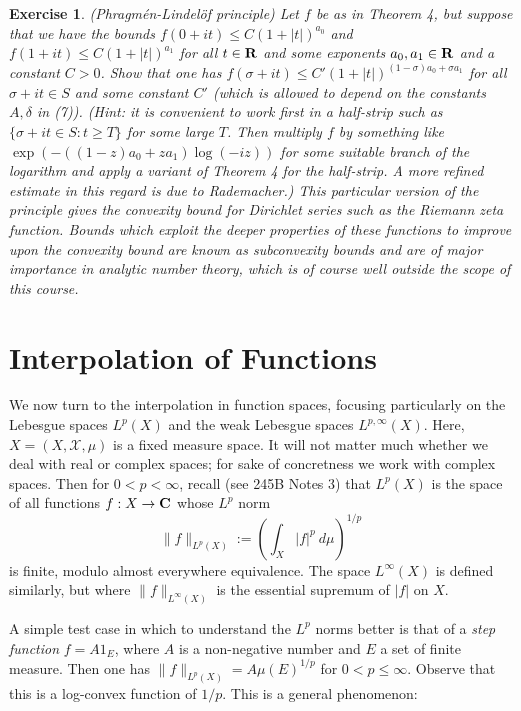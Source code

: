 \documentclass[10pt,reqno]{amsart}
\newtheorem{exercise}[theorem]{Exercise}
\begin{document}
\begin{exercise}
    (Phragmén-Lindelöf principle) Let $f$ be as in Theorem 4, but suppose that we have the bounds $f(0+it) \leq C(1+|t|)^{a_0}$ and $f(1+it) \leq C(1+|t|)^{a_1}$ for all $t \in {\bf R}$ and some exponents $a_0,a_1 \in {\bf R}$ and a constant $C>0$. Show that one has $f(\sigma+it) \leq C' (1+|t|)^{(1-\sigma) a_0 + \sigma a_1}$ for all $\sigma+it \in S$ and some constant $C'$ (which is allowed to depend on the constants $A, \delta$ in (7)). (Hint: it is convenient to work first in a half-strip such as $\{ \sigma+it \in S: t \geq T \}$ for some large $T$. Then multiply $f$ by something like $\exp( - ((1-z)a_0+z a_1) \log(-iz) )$ for some suitable branch of the logarithm and apply a variant of Theorem 4 for the half-strip. A more refined estimate in this regard is \emph{due to Rademacher}.) This particular version of the principle gives the \emph{convexity bound} for Dirichlet series such as the Riemann zeta function. Bounds which exploit the deeper properties of these functions to improve upon the convexity bound are known as \emph{subconvexity bounds} and are of major importance in analytic number theory, which is of course well outside the scope of this course. 
\end{exercise}

\section{Interpolation of Functions}

We now turn to the interpolation in function spaces, focusing particularly on the Lebesgue spaces $L^p(X)$ and the weak Lebesgue spaces $L^{p,\infty}(X)$. Here, $X = (X, {\mathcal X},\mu)$ is a fixed measure space. It will not matter much whether we deal with real or complex spaces; for sake of concretness we work with complex spaces. Then for $0 < p < \infty$, recall (see 245B Notes 3) that $L^p(X)$ is the space of all functions $f: X \rightarrow {\bf C}$ whose $L^p$ norm
%
\[ \|f\|_{L^p(X)} := \left(\int_X |f|^p\ d\mu \right)^{1/p}\]
%
is finite, modulo almost everywhere equivalence. The space $L^\infty(X)$ is defined similarly, but where $\|f\|_{L^\infty(X)}$ is the essential supremum of $|f|$ on $X$.

A simple test case in which to understand the $L^p$ norms better is that of a \emph{step function} $f = A 1_E$, where $A$ is a non-negative number and $E$ a set of finite measure. Then one has $\|f\|_{L^p(X)} = A \mu(E)^{1/p}$ for $0 < p \leq \infty$. Observe that this is a log-convex function of $1/p$. This is a general phenomenon:
\end{document}
